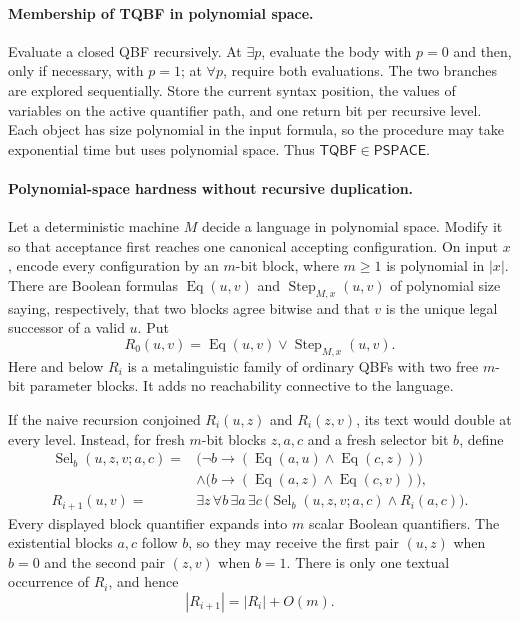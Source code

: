 \paragraph{Membership of TQBF in polynomial space.}
Evaluate a closed QBF recursively.  At \(\exists p\), evaluate the body with
\(p=0\) and then, only if necessary, with \(p=1\); at \(\forall p\), require
both evaluations.  The two branches are explored sequentially.  Store the
current syntax position, the values of variables on the active quantifier path,
and one return bit per recursive level.  Each object has size polynomial in the
input formula, so the procedure may take exponential time but uses polynomial
space.  Thus \(\mathsf{TQBF}\in\mathsf{PSPACE}\).

\paragraph{Polynomial-space hardness without recursive duplication.}
Let a deterministic machine \(M\) decide a language in polynomial space.
Modify it so that acceptance first reaches one canonical accepting
configuration.  On input \(x\), encode every configuration by an \(m\)-bit
block, where \(m\geq1\) is polynomial in \(|x|\).  There are Boolean formulas
\(\operatorname{Eq}(u,v)\) and
\(\operatorname{Step}_{M,x}(u,v)\) of polynomial size saying, respectively,
that two blocks agree bitwise and that \(v\) is the unique legal successor of a
valid \(u\).  Put
\[
 R_0(u,v)=\operatorname{Eq}(u,v)\lor
          \operatorname{Step}_{M,x}(u,v).
\]
Here and below \(R_i\) is a metalinguistic family of ordinary QBFs with two free
\(m\)-bit parameter blocks.  It adds no reachability connective to the
language.

If the naive recursion conjoined \(R_i(u,z)\) and \(R_i(z,v)\), its text would
double at every level.  Instead, for fresh \(m\)-bit blocks \(z,a,c\) and a
fresh selector bit \(b\), define
\[
\begin{aligned}
 \operatorname{Sel}_b(u,z,v;a,c)
  ={}&\bigl(\neg b\to
       (\operatorname{Eq}(a,u)\land\operatorname{Eq}(c,z))\bigr)\\
    &\land\bigl(b\to
       (\operatorname{Eq}(a,z)\land\operatorname{Eq}(c,v))\bigr),\\
 R_{i+1}(u,v)
  ={}&\exists z\,\forall b\,\exists a\,\exists c\,
       \bigl(\operatorname{Sel}_b(u,z,v;a,c)\land R_i(a,c)\bigr).
\end{aligned}
\]
Every displayed block quantifier expands into \(m\) scalar Boolean quantifiers.
The existential blocks \(a,c\) follow \(b\), so they may receive the first pair
\((u,z)\) when \(b=0\) and the second pair \((z,v)\) when \(b=1\).  There is
only one textual occurrence of \(R_i\), and hence
\[
 |R_{i+1}|=|R_i|+O(m).
\]

